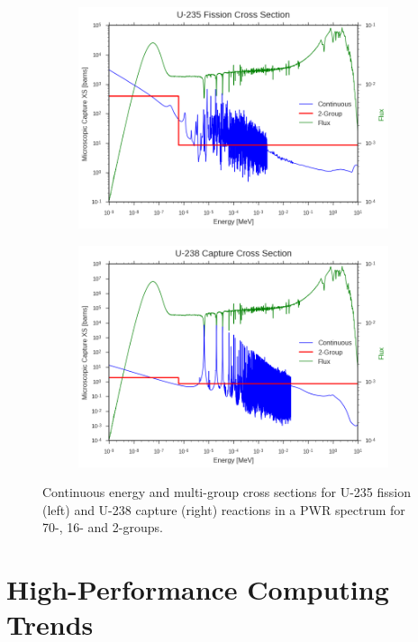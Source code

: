 \begin{figure}
\begin{subfigure}{.5\textwidth}
  \includegraphics[width=\linewidth]{figures/intro/u235-fission-2}
  \caption{}
  \label{fig:assm-neighbors}
\end{subfigure}
\begin{subfigure}{.5\textwidth}
  \centering
  \includegraphics[width=\linewidth]{figures/intro/u238-capture-2}
  \caption{}
  \label{fig:colorset-neighbors}
\end{subfigure}
\caption{Continuous energy and multi-group cross sections for U-235 fission (left) and U-238 capture (right) reactions in a PWR spectrum for 70-, 16- and 2-groups.}
\label{fig:pwr-ce-mg-xs}
\end{figure}


\section{High-Performance Computing Trends}
\label{sec:chap1-hpc-trends}


